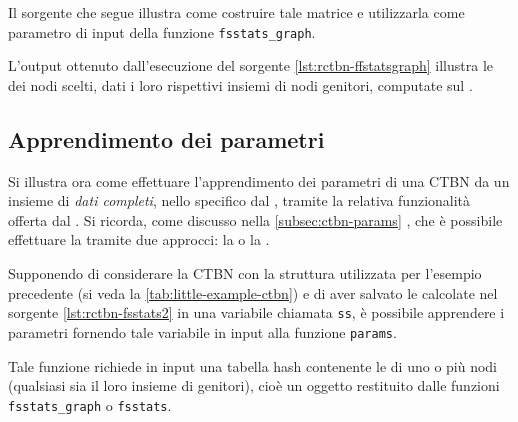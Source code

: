 Il sorgente che segue illustra come costruire tale matrice e utilizzarla come parametro di input della funzione \lstinline[language=rstats]{fsstats_graph}.

\vspace*{8pt}

L'output ottenuto dall'esecuzione del sorgente \ref{lst:rctbn-ffstatsgraph} illustra le \emph{\stats{}} dei nodi scelti, dati i loro rispettivi insiemi di nodi genitori, computate sul .

\vspace*{8pt}

\subsection{Apprendimento dei parametri}
Si illustra ora come effettuare l'apprendimento dei parametri di una \acs{CTBN} da un insieme di \emph{dati completi}, nello specifico dal , tramite la relativa funzionalità offerta dal \pacchettor{}. Si ricorda, come discusso nella \autoref{subsec:ctbn-params} , che è possibile effettuare la  tramite due approcci: la  o la .

Supponendo di considerare la \acs{CTBN} con la struttura utilizzata per l'esempio precedente (si veda la \vref{tab:little-example-ctbn}) e di aver salvato le \emph{\stats{}} calcolate nel sorgente \ref{lst:rctbn-fsstats2} in una variabile chiamata \lstinline$ss$, è possibile apprendere i parametri fornendo tale variabile in input alla funzione \lstinline[language=rstats]{params}.


Tale funzione richiede in input una tabella hash contenente le \emph{\stats{}} di uno o più nodi (qualsiasi sia il loro insieme di genitori), cioè un oggetto restituito dalle funzioni \lstinline[language=rstats]{fsstats_graph} o \lstinline[language=rstats]{fsstats}.

